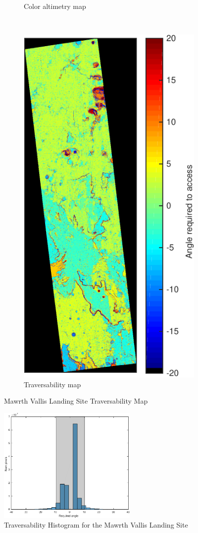 \documentclass[12pt]{article}
\begin{document}
\begin{figure}[h!]
\begin{subfigure}[t]{0.35\textwidth}
    \caption{Color altimetry map}
    \label{fig:holden_dtm}
  \end{subfigure}
  ~
  \begin{subfigure}[t]{0.35\textwidth}
    \centering
    \includegraphics[height=0.4\paperheight]{figures/maps/ESP_019612_1535/DTEEC_019612_1535_019678_1535_U01-traversability_map.pdf}
    \caption{Traversability map}
    \label{fig:holden_traversability}
  \end{subfigure}
  \caption{Mawrth Vallis Landing Site Traversability Map}
  \label{fig:holden}
\end{figure}
\begin{figure}[h!]
  \centering
  \includegraphics[width=0.6\textwidth]{figures/maps/ESP_019612_1535/DTEEC_019612_1535_019678_1535_U01-hist.pdf}
  \caption{Traversability Histogram for the Mawrth Vallis Landing Site}
  \label{fig:holden_hist}
\end{figure}
\end{document}
